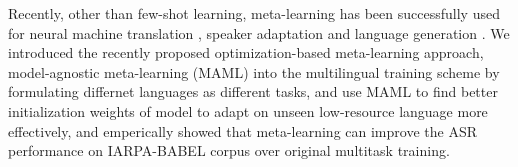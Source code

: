 Recently, other than few-shot learning, meta-learning has been successfully used for neural machine translation \cite{gu2018meta}, speaker adaptation \cite{klejch2018learning} and language generation \cite{mi2019meta}. We introduced the recently proposed optimization-based meta-learning approach, model-agnostic meta-learning (MAML) \cite{finn2017model} into the multilingual training scheme by formulating differnet languages as different tasks, and use MAML to find better initialization weights of model to adapt on unseen low-resource language more effectively, and emperically showed that meta-learning can improve the ASR performance on IARPA-BABEL corpus over original multitask training.

\label{sec:intro}

